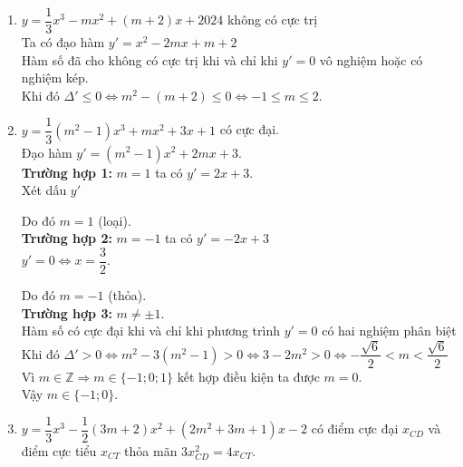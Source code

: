 \begin{bt}
{\begin{enumerate}
			\item $y = \dfrac{1}{3}x^3 - mx^2  + (m + 2)x + 2024$ không có cực trị\\
			Ta có đạo hàm $y' =  x^2 - 2mx + m + 2$\\
			Hàm số đã cho không có cực trị khi và chỉ khi $y' = 0$  vô nghiệm hoặc có nghiệm kép.\\
			Khi đó $\Delta' \le 0 \Leftrightarrow m^2 - (m + 2) \le 0 \Leftrightarrow -1 \le m  \le 2$.
			\item $y = \dfrac{1}{3}(m^2 - 1)x^3 +  mx^2 + 3x + 1$ có cực đại.\\
			Đạo hàm $y' = (m^2 - 1)x^2 + 2mx + 3$.\\ 
			\textbf{Trường hợp 1:} $m = 1$ ta có $y' = 2x +  3$.\\
			Xét  dấu $y'$
			\begin{center}
			\end{center}
			 Do đó $m=1$ (loại).\\
			\textbf{Trường hợp 2:} $m =  -1$ ta có $y' = -2x + 3$\\
			$y' = 0  \Leftrightarrow x = \dfrac{3}{2}$.
			\begin{center}
			\end{center}
			Do đó $m=-1$ (thỏa).\\ 
			\textbf{Trường  hợp 3:} $m \ne \pm1$.\\
			Hàm số có cực đại khi và chỉ khi  phương trình $y' = 0$ có hai nghiệm phân biệt\\
			Khi đó $\Delta' > 0 \Leftrightarrow m^2 - 3(m^2 - 1) > 0 \Leftrightarrow 3 -  2m^2 > 0 \Leftrightarrow -\dfrac{\sqrt{6}}{2} < m < \dfrac{\sqrt{6}}{2}$\\
			Vì $m \in \mathbb{Z} \Rightarrow m \in \{-1;0;1\}$ kết hợp  điều kiện ta được $m = 0$.\\
			Vậy $m \in \{-1;0\}$. 
			\item $y = \dfrac{1}{3}x^3 - \dfrac{1}{2}(3m + 2)x^2 + (2m^2  + 3m + 1)x - 2$ có điểm cực đại $x_{CD}$ và điểm cực tiểu $x_{CT}$ thỏa mãn $3x_{CD}^2 = 4x_{CT}$.\\

\end{enumerate}}
\end{bt}
